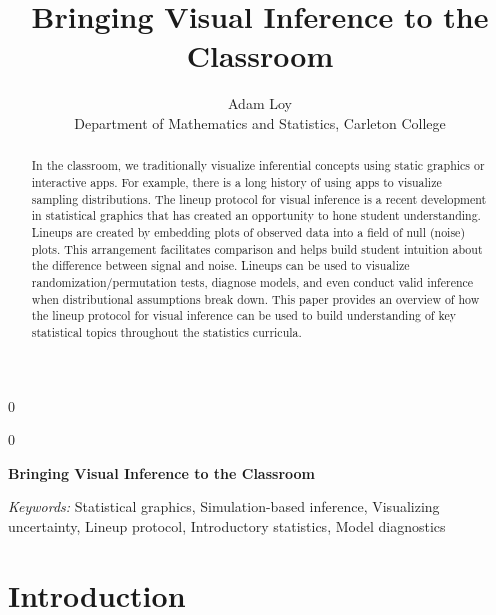 \documentclass[12pt]{article}
\newcommand{\blind}{0}
\begin{document}
\def\spacingset#1{\renewcommand{\baselinestretch}%
{#1}\small\normalsize} \spacingset{1}



\blind
{
  \title{\bf Bringing Visual Inference to the Classroom}

  \author{
        Adam Loy \\
    Department of Mathematics and Statistics, Carleton College\\
      }
  \maketitle
} \fi

\blind
{
  \bigskip
  \bigskip
  \bigskip
  \begin{center}
    {\LARGE\bf Bringing Visual Inference to the Classroom}
  \end{center}
  \medskip
} \fi

\bigskip
\begin{abstract}
In the classroom, we traditionally visualize inferential concepts using
static graphics or interactive apps. For example, there is a long
history of using apps to visualize sampling distributions. The lineup
protocol for visual inference is a recent development in statistical
graphics that has created an opportunity to hone student understanding.
Lineups are created by embedding plots of observed data into a field of
null (noise) plots. This arrangement facilitates comparison and helps
build student intuition about the difference between signal and noise.
Lineups can be used to visualize randomization/permutation tests,
diagnose models, and even conduct valid inference when distributional
assumptions break down. This paper provides an overview of how the
lineup protocol for visual inference can be used to build understanding
of key statistical topics throughout the statistics curricula.
\end{abstract}

\noindent%
{\it Keywords:} Statistical graphics, Simulation-based
inference, Visualizing uncertainty, Lineup protocol, Introductory
statistics, Model diagnostics
\vfill

\newpage
\spacingset{1.45} %

\hypertarget{introduction}{%
\section{Introduction}\label{introduction}}
\end{document}
